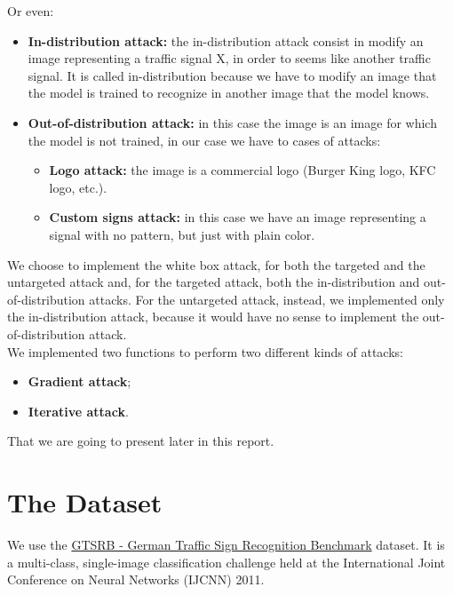 Or even:
\begin{itemize}
	\item \textbf{In-distribution attack:} the in-distribution attack consist in modify an image representing a traffic signal X, in order to seems like another traffic signal. It is called in-distribution because we have to modify an image that the model is trained to recognize in another image that the model knows. 
\newline
	\item \textbf{Out-of-distribution attack:} in this case the image is an image for which the model is not trained, in our case we have to cases of attacks:
        \begin{itemize}
          \item{\textbf{Logo attack:}} the image is a commercial logo (Burger King logo, KFC logo, etc.).
          \item{\textbf{Custom signs attack:}}  in this case we have an image representing a signal with no pattern, but just with plain color.
       \end{itemize}
\end{itemize}
We choose to implement the white box attack, for both the targeted and the untargeted attack and, for the targeted attack, both the in-distribution and out-of-distribution attacks.
For the untargeted attack, instead, we implemented only the in-distribution attack, because it would have no sense to implement the out-of-distribution attack.\\
\newline
We implemented two functions to perform two different kinds of attacks:
\begin{itemize}
	\item \textbf{Gradient attack};
	\item \textbf{Iterative attack}.
\end{itemize}
That we are going to present later in this report.



\section{The Dataset}

We use the \href{https://www.kaggle.com/meowmeowmeowmeowmeow/gtsrb-german-traffic-sign/data}{GTSRB - German Traffic Sign Recognition Benchmark} dataset. It is a multi-class, single-image classification challenge held at the International Joint Conference on Neural Networks (IJCNN) 2011.

